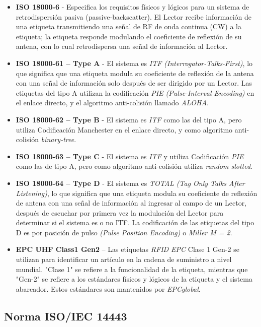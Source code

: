 \begin{itemize}
\item \textbf{ISO 18000-6} - Especifica los requisitos físicos y lógicos para un sistema de retrodispersión pasiva (passive-backscatter). El Lector recibe información de una etiqueta transmitiendo una señal de RF de onda continua (CW) a la etiqueta; la etiqueta responde modulando el coeficiente de reflexión de su antena, con lo cual retrodispersa una señal de información al Lector. 
\item \textbf{ISO 18000-61 – Type A} - El sistema es \textit{ITF (Interrogator-Talks-First)}, lo que significa que una etiqueta modula su coeficiente de reflexión de la antena con una señal de información solo después de ser dirigido por un Lector. Las etiquetas del tipo A utilizan la codificación \textit{PIE (Pulse-Interval Encoding)} en el enlace directo, y el algoritmo anti-colisión llamado \textit{ALOHA}.
\item \textbf{ISO 18000-62 – Type B} - El sistema es \textit{ITF} como las del tipo A, pero utiliza Codificación Manchester en el enlace directo, y como algoritmo anti-colisión \textit{binary-tree}.
\item \textbf{ISO 18000-63 – Type C} - El sistema es \textit{ITF} y utiliza Codificación \textit{PIE} como las de tipo A, pero como algoritmo anti-colisión utiliza \textit{random slotted}.
\item \textbf{ISO 18000-64 – Type D} - El sistema es \textit{TOTAL (Tag Only Talks After Listening)}, lo que significa que una etiqueta modula su coeficiente de reflexión de antena con una señal de información al ingresar al campo de un Lector, después de escuchar por primera vez la modulación del Lector para determinar si el sistema es o no ITF. La codificación de las etiquetas del tipo D es por posición de pulso \textit{(Pulse Position Encoding)} o \textit{Miller M = 2}.
\item \textbf{EPC UHF Class1 Gen2} – Las etiquetas \textit{RFID EPC} Clase 1 Gen-2 se utilizan para identificar un artículo en la cadena de suministro a nivel mundial. "Clase 1" se refiere a la funcionalidad de la etiqueta, mientras que "Gen-2" se refiere a los estándares físicos y lógicos de la etiqueta y el sistema abarcador. Estos estándares son mantenidos por \textit{EPCglobal}. 
\end{itemize}

\subsection{Norma ISO/IEC 14443} \label{sec:iso}

